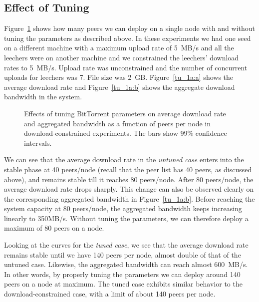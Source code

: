 \documentclass[10pt,letterpaper,twocolumn]{article}
\begin{document}
\subsection{Effect of Tuning}
\label{improved_result}

Figure~\ref{fig:effect-tuning} shows how many peers we can deploy on a
single node with and without tuning the parameters as described
above. In these experiments we had one seed on a different machine
with a maximum upload rate of 5~MB/s and all the leechers were on
another machine and we constrained the leechers' download rates to
5~MB/s. Upload rate was unconstrained and the number of concurrent
uploads for leechers was 7. File size was 2~GB. Figure~\ref{tu_1a:a}
shows the average download rate and Figure~\ref{tu_1a:b} shows the
aggregate download bandwidth in the system.

\begin{figure}[!tb] 
  \centering 
  \caption{Effects of tuning BitTorrent parameters on average download
    rate and aggregated bandwidth as a function of peers per node in
    download-constrained experiments. The bars show 99\% confidence
    intervals.}
  \label{fig:effect-tuning}
\end{figure}

We can see that the average download rate in the \textit{untuned case}
enters into the stable phase at 40 peers/node (recall that the peer
list has 40 peers, as discussed above), and remains stable till it
reaches 80 peers/node. After 80 peers/node, the average download rate
drops sharply. This change can also be observed clearly on the
corresponding aggregated bandwidth in Figure~\ref{tu_1a:b}. Before
reaching the system capacity at 80 peers/node, the aggregated
bandwidth keeps increasing linearly to 350MB/s. Without tuning the
parameters, we can therefore deploy a maximum of 80 peers on a node.

Looking at the curves for the \textit{tuned case}, we see that the
average download rate remains stable until we have 140 peers per node,
almost double of that of the untuned case. Likewise, the aggregated
bandwidth can reach almost 600~MB/s. In other words, by properly
tuning the parameters we can deploy around 140 peers on a node at
maximum. The tuned case exhibits similar behavior to the
download-constrained case, with a limit of about 140 peers per node.
\end{document}

